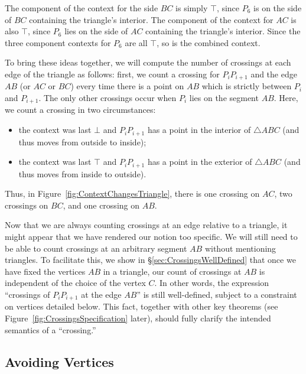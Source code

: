 The component of the context for the side $BC$ is simply $\top$, since $P_6$ is on the side of $BC$ containing the triangle's interior. The component of the context for $AC$ is also $\top$, since $P_6$ lies on the side of $AC$ containing the triangle's interior. Since the three component contexts for $P_6$ are all $\top$, so is the combined context.

To bring these ideas together, we will compute the number of crossings at each edge of the triangle as follows: first, we count a crossing for $P_iP_{i+1}$ and the edge $AB$ (or $AC$ or $BC$) every time there is a point on $AB$ which is strictly between $P_i$ and $P_{i+1}$. The only other crossings occur when $P_i$ lies on the segment $AB$. Here, we count a crossing in two circumstances:
\begin{itemize}
\item the context was last $\bot$ and $P_iP_{i+1}$ has a point in the interior of $\triangle ABC$ (and thus moves from outside to inside);
\item the context was last $\top$ and $P_iP_{i+1}$ has a point in the exterior of $\triangle ABC$ (and thus moves from inside to outside).
\end{itemize}

Thus, in Figure~\ref{fig:ContextChangesTriangle}, there is one crossing on $AC$, two crossings on $BC$, and one crossing on $AB.$

Now that we are always counting crossings at an edge relative to a triangle, it might appear that we have rendered our notion too specific. We will still need to be able to count crossings at an arbitrary segment $AB$ without mentioning triangles. To facilitate this, we show in \S\ref{sec:CrossingsWellDefined} that once we have fixed the vertices $AB$ in a triangle, our count of crossings at $AB$ is independent of the choice of the vertex $C$. In other words, the expression ``crossings of $P_iP_{i+1}$ at the edge $AB$'' is still well-defined, subject to a constraint on vertices detailed below. This fact, together with other key theorems (see Figure~\ref{fig:CrossingsSpecification} later), should fully clarify the intended semantics of a ``crossing.''

\subsection{Avoiding Vertices}\label{sec:EdgeCases}

